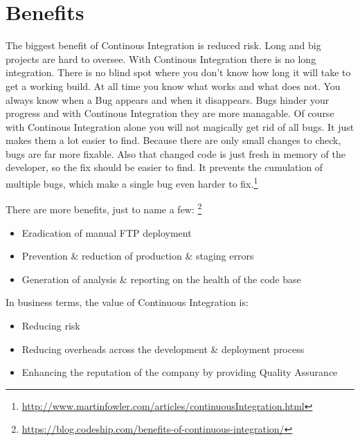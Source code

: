 \section{Benefits}
The biggest benefit of Continous Integration is reduced risk. Long and big projects are hard to oversee. With Continous Integration there is no long integration.
There is no blind spot where you don't know how long it will take to get a working build. At all time you know what works and what does not.
You always know when a Bug appears and when it disappears. Bugs hinder your progress and with Continous Integration they are more managable.
Of course with Continous Integration alone you will not magically get rid of all bugs. It just makes them a lot easier to find. Because there are only small changes 
to check, bugs are far more fixable. Also that changed code is just fresh in memory of the developer, so the fix should be easier to find.
It prevents the cumulation of multiple bugs, which make a single bug even harder to fix.\footnote{\url{http://www.martinfowler.com/articles/continuousIntegration.html}}

There are more benefits, just to name a few: \footnote{\url{https://blog.codeship.com/benefits-of-continuous-integration/}}
\begin{itemize}
\item Eradication of manual FTP deployment
\item Prevention \& reduction of production \& staging errors
\item Generation of analysis \& reporting on the health of the code base
\end{itemize}

In business terms, the value of Continuous Integration is:
\begin{itemize}
\item Reducing risk
\item Reducing overheads across the development \& deployment process
\item Enhancing the reputation of the company by providing Quality Assurance
\end{itemize}


